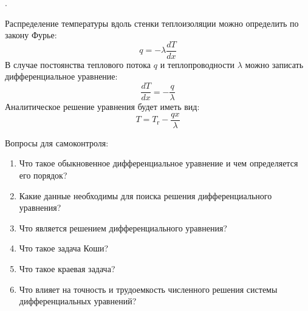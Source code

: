 .

Распределение температуры вдоль стенки теплоизоляции можно определить по закону Фурье:
\begin{equation}
q=-\lambda \dfrac{d T}{d x}
\end{equation} 
В случае постоянства теплового потока $q$ и теплопроводности $\lambda$ можно записать дифференциальное уравнение:
\begin{equation}
\dfrac{d T}{d x} =- \dfrac{q}{\lambda}
\end{equation}
Аналитическое решение уравнения будет иметь вид:
\begin{equation}
T = T_г - \dfrac{q x}{\lambda}
\end{equation}

Вопросы для самоконтроля:
\begin{enumerate}
	\item Что такое обыкновенное дифференциальное уравнение и чем определяется его порядок?
	\item Какие данные необходимы для поиска решения дифференциального уравнения?
	\item Что является решением дифференциального уравнения?
	\item Что такое задача Коши?
	\item Что такое краевая задача?
	\item Что влияет на точность и трудоемкость численного решения системы дифференциальных уравнений?
\end{enumerate}
